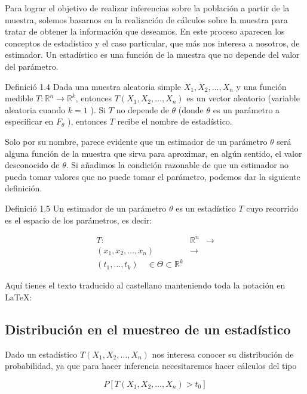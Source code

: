 \documentclass[
]{article}
\begin{document}
Para lograr el objetivo de realizar inferencias sobre la población a partir de la muestra, solemos basarnos en la realización de cálculos sobre la muestra para tratar de obtener la información que deseamos. En este proceso aparecen los conceptos de estadístico y el caso particular, que más nos interesa a nosotros, de estimador. Un estadístico es una función de la muestra que no depende del valor del parámetro.

Definició 1.4 Dada una muestra aleatoria simple \(X_{1}, X_{2}, \ldots, X_{n}\) y una función medible \(T: \mathbb{R}^{n} \longrightarrow \mathbb{R}^{k}\), entonces \(T\left(X_{1}, X_{2}, \ldots, X_{n}\right)\) es un vector aleatorio (variable aleatoria cuando \(k=1\) ). Si \(T\) no depende de \(\theta\) (donde \(\theta\) es un parámetro a especificar en \(F_{\theta}\) ), entonces \(T\) recibe el nombre de estadístico.

Solo por su nombre, parece evidente que un estimador de un parámetro \(\theta\) será alguna función de la muestra que sirva para aproximar, en algún sentido, el valor desconocido de \(\theta\). Si añadimos la condición razonable de que un estimador no pueda tomar valores que no puede tomar el parámetro, podemos dar la siguiente definición.

Definició 1.5 Un estimador de un parámetro \(\theta\) es un estadístico \(T\) cuyo recorrido es el espacio de los parámetros, es decir:

\[
\begin{array}{ccc}
T: & \mathbb{R}^{n} & \longrightarrow \\
\left(x_{1}, x_{2}, \ldots, x_{n}\right) & \longrightarrow \\
\left(t_{1}, \ldots, t_{k}\right) \quad \in \Theta \subset \mathbb{R}^{k}
\end{array}
\]

Aquí tienes el texto traducido al castellano manteniendo toda la notación en LaTeX:

\subsection{Distribución en el muestreo de un estadístico}\label{distribuciuxf3n-en-el-muestreo-de-un-estaduxedstico}

Dado un estadístico \(T\left(X_{1}, X_{2}, \ldots, X_{n}\right)\) nos interesa conocer su distribución de probabilidad, ya que para hacer inferencia necesitaremos hacer cálculos del tipo

\[
P\left[T\left(X_{1}, X_{2}, \ldots, X_{n}\right)>t_{0}\right]
\]
\end{document}
